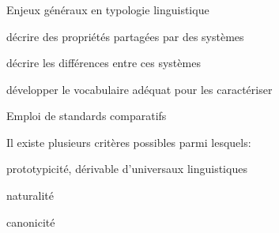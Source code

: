 \begin{frame}
\frametitle{}
\begin{wideitemize}
\item Enjeux généraux en typologie linguistique
\begin{smallwideitemize}
  \item décrire des propriétés partagées par des systèmes
  \item {décrire les différences entre ces systèmes}
  \item développer le vocabulaire adéquat pour les caractériser
\end{smallwideitemize}
\item {Emploi de standards comparatifs}
\begin{smallwideitemize}
\item Il existe plusieurs critères possibles parmi lesquels:
\begin{smallwideitemize}\footnotesize
  \item prototypicité, dérivable d'universaux linguistiques \cite{greenberg63}
  \item naturalité \cite{wurzel84,dressler00}
  \item {canonicité \cite{corbett03,corbett07b}}
\end{smallwideitemize}
\end{smallwideitemize}
{}
\end{wideitemize}
\end{frame}

